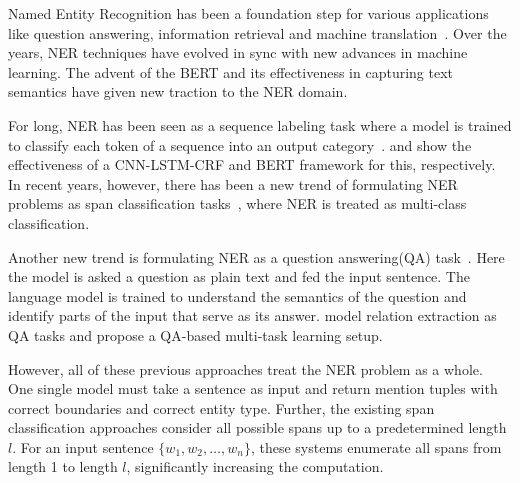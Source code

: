 
Named Entity Recognition has been %
a foundation step for various applications like question answering, information retrieval and machine translation~\cite{li2020survey}. 
Over the years, NER techniques have evolved in sync with new advances in machine learning. 
The advent of the BERT \cite{devlin2019bert} and its effectiveness in capturing text semantics have given new traction to the NER domain. 

For long, NER has been seen as a sequence labeling task where a model is trained to classify each token of a sequence into an output category~\cite{Chiu16,Lample16,ma2016end,devlin2019bert}.
\cite{ma2016end} and \cite{devlin2018bert} show the effectiveness of a CNN-LSTM-CRF and BERT framework for this, respectively. 
In recent years, however, there has been a new trend of formulating NER problems %
as span classification tasks~\cite{li2020MRC,Jiang20,Ouchi20}, 
where NER is treated as multi-class classification.

Another new trend is formulating NER as a question answering(QA) task~\cite{li2020MRC}. 
Here the model is asked a question as plain text and fed the input sentence. The language model is trained to understand the semantics of the question and identify parts of the input that serve as its answer. \cite{li2020MRC,levy2017zero} model relation extraction as QA tasks and \cite{mccann2018natural} propose a QA-based multi-task learning setup.

However, all of these previous approaches treat the NER problem as a whole. One single model must take a sentence as input and return mention tuples with correct boundaries and correct entity type. 
Further, the existing span classification approaches consider all possible spans up to a predetermined length $l$.
For an input sentence $\{w_1, w_2, \ldots, w_n\}$, these systems enumerate all spans from length 1 to length $l$,
significantly increasing the computation.

